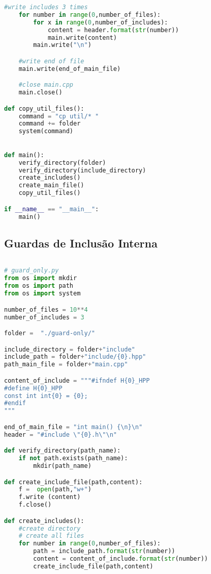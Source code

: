 \begin{apendicesenv}
\begin{lstlisting}[language=Python,caption={
            Script Guardas de Inclusão Externa },
                   label=script_external_include]
    #write includes 3 times
    for number in range(0,number_of_files):
        for x in range(0,number_of_includes):
            content = header.format(str(number))
            main.write(content)
        main.write("\n")

    #write end of file
    main.write(end_of_main_file)

    #close main.cpp
    main.close()

def copy_util_files():
    command = "cp util/* "
    command += folder
    system(command)
    

def main():
    verify_directory(folder)
    verify_directory(include_directory)
    create_includes()
    create_main_file()
    copy_util_files()

if __name__ == "__main__":
    main()
\end{lstlisting}

\subsection{Guardas de Inclusão Interna}
\begin{lstlisting}[language=Python,caption={
              Script Guardas de Inclusão Interna},
                     label=script_intenal_include]
                     
# guard_only.py
from os import mkdir
from os import path
from os import system

number_of_files = 10**4
number_of_includes = 3

folder =  "./guard-only/"

include_directory = folder+"include"
include_path = folder+"include/{0}.hpp"
path_main_file = folder+"main.cpp"

content_of_include = """#ifndef H{0}_HPP
#define H{0}_HPP
const int int{0} = {0};
#endif
"""

end_of_main_file = "int main() {\n}\n"
header = "#include \"{0}.h\"\n"

def verify_directory(path_name):
    if not path.exists(path_name):
        mkdir(path_name)

def create_include_file(path,content):
    f =  open(path,"w+")
    f.write (content)
    f.close()

def create_includes():
    #create directory
    # create all files
    for number in range(0,number_of_files):
        path = include_path.format(str(number))
        content = content_of_include.format(str(number))
        create_include_file(path,content)
    

\end{lstlisting}
\end{apendicesenv}
